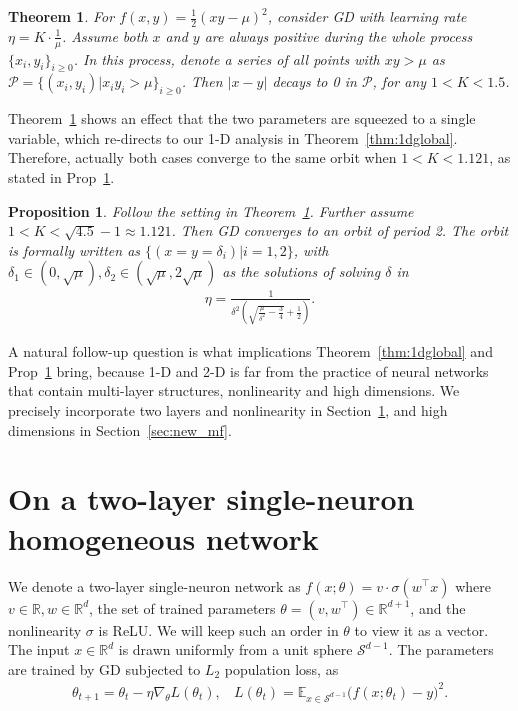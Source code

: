 \documentclass{article}
\theoremstyle{plain}
\newtheorem{theorem}{Theorem}
\newtheorem{prop}{Proposition}
\theoremstyle{remark}
\newcommand{\red}[1]{{\color{black}#1}}
\def\R{\mathbb{R}}
\begin{document}
\begin{theorem}
For $f(x,y)=\frac{1}{2}\left(xy-\mu\right)^2$, consider GD with learning rate $\eta=K\cdot\frac{1}{\mu}$. Assume both $x$ and $y$ are always positive during the whole process $\{x_i,y_i\}_{i\ge 0}$. In this process, denote a series of all points with $xy>\mu$ as $\mathcal{P}=\{(x_i,y_i)|x_i y_i>\mu\}_{i\ge0}$. Then $|x-y|$ \red{decays to 0} in $\mathcal{P}$, for any $1<K<1.5$.
\label{thm:xy_diff_decay}
\end{theorem}

Theorem~\ref{thm:xy_diff_decay} shows an effect that the two parameters are squeezed to a single variable, which re-directs to our 1-D analysis in Theorem~\ref{thm:1dglobal}. Therefore, actually both cases converge to the same orbit when $1<K< 1.121$, as stated in Prop~\ref{prop:xy}.

\begin{prop}
    Follow the setting in Theorem~\ref{thm:xy_diff_decay}. Further assume $1<K<\sqrt{4.5}-1\approx 1.121$. Then GD converges to an orbit of period 2. The orbit is formally written as $\{(x=y=\delta_i)|i=1,2\}$, with $\delta_1\in(0,\sqrt{\mu}), \delta_2\in(\sqrt{\mu},2\sqrt{\mu})$  as the solutions of solving $\delta$ in
\begin{align*}
    \eta  = \frac{1}{\delta^2\left( \sqrt{\frac{\mu}{\delta^2}-\frac{3}{4}} +\frac{1}{2}\right)}.
\end{align*}
\label{prop:xy}
\end{prop}

A natural follow-up question is what implications Theorem~\ref{thm:1dglobal} and Prop~\ref{prop:xy} bring, because 1-D and 2-D is far from the practice of neural networks that contain multi-layer structures, nonlinearity and high dimensions. We precisely incorporate two layers and nonlinearity in Section~\ref{sec:one_neuron}, and high dimensions in Section~\ref{sec:new_mf}.

\section{On a two-layer single-neuron homogeneous network}\label{sec:one_neuron}

We denote a two-layer single-neuron network as $f(x;\theta)=v\cdot\sigma(w^\top x)$ where $v\in\R,w\in\R^d$, the set of trained parameters $\theta=(v,w^\top)\in\R^{d+1}$, and the nonlinearity $\sigma$ is ReLU. We will keep such an order in $\theta$ to view it as a vector. The input $x\in\R^d$ is drawn uniformly from a unit sphere $\mathcal{S}^{d-1}$. The parameters are trained by GD subjected to $L_2$ population loss, as 
\begin{align*}
    \theta_{t+1}=\theta_t - \eta\nabla_{\theta} L(\theta_t),~~~~
    L(\theta_t)=\mathbb{E}_{x\in\mathcal{S}^{d-1}} \big(f(x;\theta_t)-y\big)^2.
\end{align*}
\end{document}
